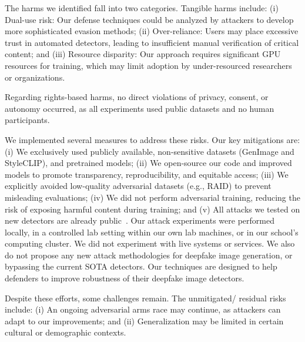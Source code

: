 \documentclass[letterpaper,twocolumn,10pt]{article}
\begin{document}
The harms we identified fall into two categories.
Tangible harms include: (i) Dual-use risk: Our defense techniques could be analyzed by attackers to develop more sophisticated evasion methods; (ii) Over-reliance: Users may place excessive trust in automated detectors, leading to insufficient manual verification of critical content; and (iii) Resource disparity: Our approach requires significant GPU resources for training, which may limit adoption by under-resourced researchers or organizations.

Regarding rights-based harms, no direct violations of privacy, consent, or autonomy occurred, as all experiments used public datasets and no human participants.

We implemented several measures to address these risks. Our key mitigations are: (i) We exclusively used publicly available, non-sensitive datasets (GenImage and StyleCLIP), and pretrained models; (ii) We open-source our code and improved models to promote transparency, reproducibility, and equitable access; (iii) We explicitly avoided low-quality adversarial datasets (e.g., RAID) to prevent misleading evaluations; (iv) We did not perform adversarial training, reducing the risk of exposing harmful content during training; and (v) All attacks we tested on new detectors are already public~\cite{Sifat2024evolvingthreat}. Our attack experiments were performed locally, in a controlled lab setting within our own lab machines, or in our school's computing cluster. We did not experiment with live systems or services. We also do not propose any new attack methodologies for deepfake image generation, or bypassing the current SOTA detectors. Our techniques are designed to help defenders to improve robustness of their deepfake image detectors.

Despite these efforts, some challenges remain. The unmitigated/ residual risks include: (i) An ongoing adversarial arms race may continue, as attackers can adapt to our improvements; and (ii) Generalization may be limited in certain cultural or demographic contexts.
\end{document}
